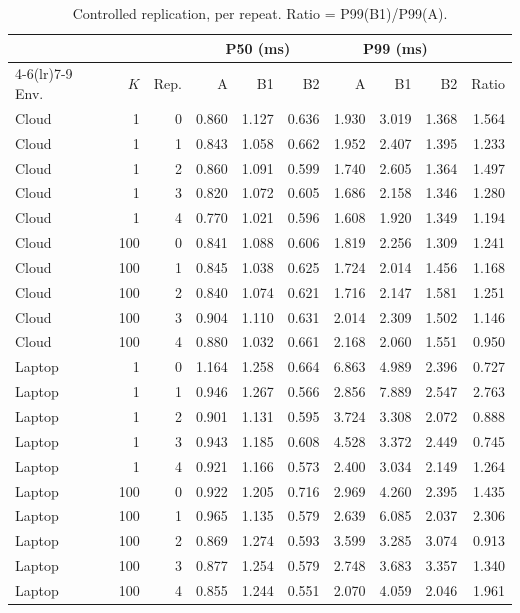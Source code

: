 \documentclass[10pt,a4paper]{article}
\begin{document}
\begin{table}[h]
\centering\small
\caption{Controlled replication, per repeat. Ratio = P99(B1)/P99(A).}\label{tab:orig_rep}
\begin{tabular}{lrrrrrrrrr}
\toprule
 & & & \multicolumn{3}{c}{P50 (ms)} & \multicolumn{3}{c}{P99 (ms)} & \\
\cmidrule(lr){4-6}\cmidrule(lr){7-9}
Env. & $K$ & Rep. & A & B1 & B2 & A & B1 & B2 & Ratio \\
\midrule
Cloud & 1 & 0 & 0.860 & 1.127 & 0.636 & 1.930 & 3.019 & 1.368 & 1.564 \\
Cloud & 1 & 1 & 0.843 & 1.058 & 0.662 & 1.952 & 2.407 & 1.395 & 1.233 \\
Cloud & 1 & 2 & 0.860 & 1.091 & 0.599 & 1.740 & 2.605 & 1.364 & 1.497 \\
Cloud & 1 & 3 & 0.820 & 1.072 & 0.605 & 1.686 & 2.158 & 1.346 & 1.280 \\
Cloud & 1 & 4 & 0.770 & 1.021 & 0.596 & 1.608 & 1.920 & 1.349 & 1.194 \\
Cloud & 100 & 0 & 0.841 & 1.088 & 0.606 & 1.819 & 2.256 & 1.309 & 1.241 \\
Cloud & 100 & 1 & 0.845 & 1.038 & 0.625 & 1.724 & 2.014 & 1.456 & 1.168 \\
Cloud & 100 & 2 & 0.840 & 1.074 & 0.621 & 1.716 & 2.147 & 1.581 & 1.251 \\
Cloud & 100 & 3 & 0.904 & 1.110 & 0.631 & 2.014 & 2.309 & 1.502 & 1.146 \\
Cloud & 100 & 4 & 0.880 & 1.032 & 0.661 & 2.168 & 2.060 & 1.551 & 0.950 \\
Laptop & 1 & 0 & 1.164 & 1.258 & 0.664 & 6.863 & 4.989 & 2.396 & 0.727 \\
Laptop & 1 & 1 & 0.946 & 1.267 & 0.566 & 2.856 & 7.889 & 2.547 & 2.763 \\
Laptop & 1 & 2 & 0.901 & 1.131 & 0.595 & 3.724 & 3.308 & 2.072 & 0.888 \\
Laptop & 1 & 3 & 0.943 & 1.185 & 0.608 & 4.528 & 3.372 & 2.449 & 0.745 \\
Laptop & 1 & 4 & 0.921 & 1.166 & 0.573 & 2.400 & 3.034 & 2.149 & 1.264 \\
Laptop & 100 & 0 & 0.922 & 1.205 & 0.716 & 2.969 & 4.260 & 2.395 & 1.435 \\
Laptop & 100 & 1 & 0.965 & 1.135 & 0.579 & 2.639 & 6.085 & 2.037 & 2.306 \\
Laptop & 100 & 2 & 0.869 & 1.274 & 0.593 & 3.599 & 3.285 & 3.074 & 0.913 \\
Laptop & 100 & 3 & 0.877 & 1.254 & 0.579 & 2.748 & 3.683 & 3.357 & 1.340 \\
Laptop & 100 & 4 & 0.855 & 1.244 & 0.551 & 2.070 & 4.059 & 2.046 & 1.961 \\
\bottomrule
\end{tabular}
\end{table}
\end{document}
